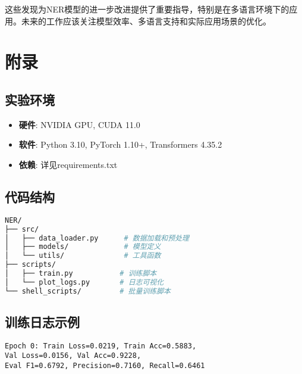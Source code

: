 \documentclass[12pt,a4paper]{article}
\begin{document}
这些发现为NER模型的进一步改进提供了重要指导，特别是在多语言环境下的应用。未来的工作应该关注模型效率、多语言支持和实际应用场景的优化。

\section{附录}

\subsection{实验环境}
\begin{itemize}
    \item \textbf{硬件}: NVIDIA GPU, CUDA 11.0
    \item \textbf{软件}: Python 3.10, PyTorch 1.10+, Transformers 4.35.2
    \item \textbf{依赖}: 详见requirements.txt
\end{itemize}

\subsection{代码结构}
\begin{lstlisting}[language=bash]
NER/
├── src/
│   ├── data_loader.py      # 数据加载和预处理
│   ├── models/             # 模型定义
│   └── utils/              # 工具函数
├── scripts/
│   ├── train.py           # 训练脚本
│   └── plot_logs.py       # 日志可视化
└── shell_scripts/         # 批量训练脚本
\end{lstlisting}

\subsection{训练日志示例}
\begin{lstlisting}[language=text]
Epoch 0: Train Loss=0.0219, Train Acc=0.5883, 
Val Loss=0.0156, Val Acc=0.9228, 
Eval F1=0.6792, Precision=0.7160, Recall=0.6461
\end{lstlisting}
\end{document}

